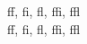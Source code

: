 \documentclass{article}
\begin{document}
	\noindent
	ff, fi, fl, ffi, ffl\\
	f\/f, f\/i, f\/l, f\/f\/i, f\/f\/l\\
\end{document}

